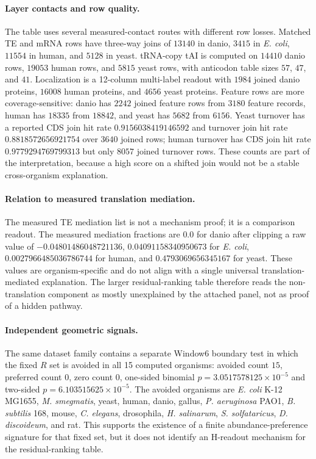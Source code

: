 \paragraph{Layer contacts and row quality.}
The table uses several measured-contact routes with different row losses.  Matched TE and mRNA rows have three-way joins of $13140$ in danio, $3415$ in \emph{E. coli}, $11554$ in human, and $5128$ in yeast.  tRNA-copy tAI is computed on $14410$ danio rows, $19053$ human rows, and $5815$ yeast rows, with anticodon table sizes $57$, $47$, and $41$.  Localization is a 12-column multi-label readout with $1984$ joined danio proteins, $16008$ human proteins, and $4656$ yeast proteins.  Feature rows are more coverage-sensitive: danio has $2242$ joined feature rows from $3180$ feature records, human has $18335$ from $18842$, and yeast has $5682$ from $6156$.  Yeast turnover has a reported CDS join hit rate $0.9156038419146592$ and turnover join hit rate $0.8818572656921754$ over $3640$ joined rows; human turnover has CDS join hit rate $0.9779294769799313$ but only $8057$ joined turnover rows.  These counts are part of the interpretation, because a high score on a shifted join would not be a stable cross-organism explanation.

\paragraph{Relation to measured translation mediation.}
The measured TE mediation list is not a mechanism proof; it is a comparison readout.  The measured mediation fractions are $0.0$ for danio after clipping a raw value of $-0.04801486048721136$, $0.04091158340950673$ for \emph{E. coli}, $0.0027966485036786744$ for human, and $0.4793069656345167$ for yeast.  These values are organism-specific and do not align with a single universal translation-mediated explanation.  The larger residual-ranking table therefore reads the non-translation component as mostly unexplained by the attached panel, not as proof of a hidden pathway.

\paragraph{Independent geometric signals.}
The same dataset family contains a separate Window6 boundary test in which the fixed $R$ set is avoided in all 15 computed organisms: avoided count $15$, preferred count $0$, zero count $0$, one-sided binomial $p=3.0517578125\times 10^{-5}$ and two-sided $p=6.103515625\times 10^{-5}$.  The avoided organisms are \emph{E. coli} K-12 MG1655, \emph{M. smegmatis}, yeast, human, danio, gallus, \emph{P. aeruginosa} PAO1, \emph{B. subtilis} 168, mouse, \emph{C. elegans}, drosophila, \emph{H. salinarum}, \emph{S. solfataricus}, \emph{D. discoideum}, and rat.  This supports the existence of a finite abundance-preference signature for that fixed set, but it does not identify an H-readout mechanism for the residual-ranking table.

